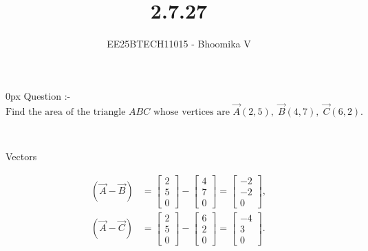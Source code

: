 \documentclass[journal]{IEEEtran}
\begin{document}

\vspace{3cm}

\title{2.7.27}
\author{EE25BTECH11015 - Bhoomika V}
{\let\newpage\relax\maketitle}

\renewcommand{\thefigure}{\theenumi}
\renewcommand{\thetable}{\theenumi}
\setlength{\intextsep}{10pt} %


\renewcommand{\thetable}{\theenumi}
\parindent 0px 
{Question :-} \\ 
\[
\text{Find the area of the triangle } ABC \text{ whose vertices are }
\vec{A}(2,5),\; \vec{B}(4,7),\; \vec{C}(6,2).
\]

\solution \\
\begin{table}[H]    
  \centering
  
  \caption{Vectors}
  \label{Answers}
\end{table}

\begin{align}
(\vec{A}-\vec{B})
&= \begin{bmatrix} 2 \\ 5 \\ 0 \end{bmatrix}
  - \begin{bmatrix} 4 \\ 7 \\ 0 \end{bmatrix}
= \begin{bmatrix} -2 \\ -2 \\ 0 \end{bmatrix},
\label{eq:AB} \\[6pt]
(\vec{A}-\vec{C})
&= \begin{bmatrix} 2 \\ 5 \\ 0 \end{bmatrix}
  - \begin{bmatrix} 6 \\ 2 \\ 0 \end{bmatrix}
= \begin{bmatrix} -4 \\ 3 \\ 0 \end{bmatrix}.
\label{eq:AC}
\end{align}
\end{document}
